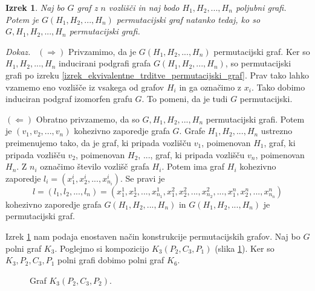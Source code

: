 \documentclass[a4paper, 12pt]{book}
\newtheorem{izrek}{Izrek}[chapter]
\newenvironment{dokaz}{\emph{Dokaz.}\ }{\hspace{\fill}{$\Box$}}
\begin{document}
\begin{izrek}
\label{izrek_konstrukcija_permutacijskega_grafa}
    Naj bo $G$ graf z $n$ vozlišči in naj bodo $H_1, H_2, ..., H_n$ poljubni grafi. Potem je $G(H_1, H_2, ..., H_n)$ permutacijski graf natanko tedaj, ko so $G, H_1, H_2, ..., H_n$ permutacijski grafi.
\end{izrek}
\begin{dokaz}
    $(\Rightarrow)$ Privzamimo, da je $G(H_1, H_2, ..., H_n)$ permutacijski graf. Ker so $H_1, H_2, ..., H_n$ inducirani podgrafi grafa $G(H_1, H_2, ..., H_n)$, so permutacijski grafi po izreku \ref{izrek_ekvivalentne_trditve_permutacijski_graf}. Prav tako lahko vzamemo eno vozlišče iz vsakega od grafov $H_i$ in ga označimo z $x_i$. Tako dobimo induciran podgraf izomorfen grafu $G$. To pomeni, da je tudi $G$ permutacijski. 
    
    $(\Leftarrow)$ Obratno privzamemo, da so $G, H_1, H_2, ..., H_n$ permutacijski grafi. Potem je $(v_1, v_2, ..., v_n)$ kohezivno zaporedje grafa $G$. Grafe $H_1, H_2, ..., H_n$ ustrezno preimenujemo tako, da je graf, ki pripada vozlišču $v_1$, poimenovan $H_1$, graf, ki pripada vozlišču $v_2$, poimenovan $H_2$, ..., graf, ki pripada vozlišču $v_n$, poimenovan $H_n$. Z $n_i$ označimo število vozlišč grafa $H_i$. Potem ima graf $H_i$ kohezivno zaporedje $l_i = (x_1^i, x_2^i, ..., x_{n_i}^i)$. Se pravi je 
    \[
        l = (l_1, l_2, ..., l_n) = (x_1^1, x_2^1, ..., x_{n_1}^1, x_1^2, x_2^2, ..., x_{n_2}^2, ..., x_1^n, x_2^n, ..., x_{n_n}^n)
    \]
    kohezivno zaporedje grafa $G(H_1, H_2, ..., H_n)$ in $G(H_1, H_2, ..., H_n)$ je permutacijski graf.
\end{dokaz}

Izrek \ref{izrek_konstrukcija_permutacijskega_grafa} nam podaja enostaven način konstrukcije permutacijskih grafov. Naj bo $G$ polni graf $K_3$. Poglejmo si kompozicijo $K_3(P_2, C_3, P_1)$ (slika \ref{graf_kompozicija_primer2}). Ker so $K_3, P_2, C_3, P_1$ polni grafi dobimo polni graf $K_6$.

\begin{figure}[h]
    \begin{center}        
    \end{center}
    \caption{Graf $K_3(P_2, C_3, P_2)$.}
    \label{graf_kompozicija_primer2}
\end{figure}
\end{document}
